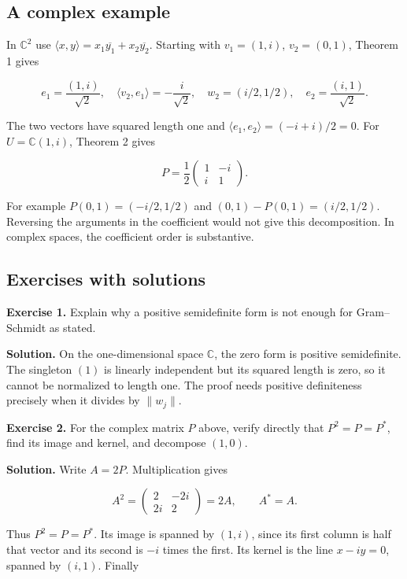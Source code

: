 \documentclass[
  english,
]{article}
\begin{document}
\subsection{A complex example}\label{a-complex-example}

In \(\mathbb C^2\) use
\(\langle x,y\rangle=x_1\overline{y_1}+x_2\overline{y_2}\). Starting
with \(v_1=(1,i)\), \(v_2=(0,1)\), Theorem 1 gives

\[
e_1=\frac{(1,i)}{\sqrt2},\quad
\langle v_2,e_1\rangle=-\frac{i}{\sqrt2},\quad
w_2=(i/2,1/2),\quad e_2=\frac{(i,1)}{\sqrt2}.
\]

The two vectors have squared length one and
\(\langle e_1,e_2\rangle=(-i+i)/2=0\). For \(U=\mathbb C(1,i)\), Theorem
2 gives

\[
P=\frac12\begin{pmatrix}1&-i\\i&1\end{pmatrix}.
\]

For example \(P(0,1)=(-i/2,1/2)\) and \((0,1)-P(0,1)=(i/2,1/2)\).
Reversing the arguments in the coefficient would not give this
decomposition. In complex spaces, the coefficient order is substantive.

\subsection{Exercises with solutions}\label{exercises-with-solutions}

\textbf{Exercise 1.} Explain why a positive semidefinite form is not
enough for Gram--Schmidt as stated.

\textbf{Solution.} On the one-dimensional space \(\mathbb C\), the zero
form is positive semidefinite. The singleton \((1)\) is linearly
independent but its squared length is zero, so it cannot be normalized
to length one. The proof needs positive definiteness precisely when it
divides by \(\|w_j\|\).

\textbf{Exercise 2.} For the complex matrix \(P\) above, verify directly
that \(P^2=P=P^*\), find its image and kernel, and decompose \((1,0)\).

\textbf{Solution.} Write \(A=2P\). Multiplication gives

\[
A^2=\begin{pmatrix}2&-2i\\2i&2\end{pmatrix}=2A,
\qquad A^*=A.
\]

Thus \(P^2=P=P^*\). Its image is spanned by \((1,i)\), since its first
column is half that vector and its second is \(-i\) times the first. Its
kernel is the line \(x-iy=0\), spanned by \((i,1)\). Finally
\end{document}
